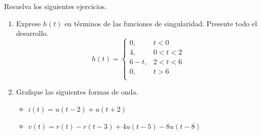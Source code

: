 \documentclass[12pt]{article}
\begin{document}

\noindent Resuelva los siguientes ejercicios.
\begin{enumerate}
    \item Exprese $h(t)$ en términos de las funciones de singularidad. Presente todo el desarrollo.\\ 
     \begin{equation}
      h(t) = \left\lbrace
      \begin{array}{ll}
      0, & t<0 \\
      4, & 0<t<2 \\
      6-t, & 2<t<6\\
      0, & t>6 \\
      \end{array}
      \right.
      \end{equation}
      
    \item Grafique las siguientes formas de onda.
    \begin{itemize} 
        \item $i(t) = u(t-2) + u(t+2)$
        \item  $v(t) = r(t) - r(t-3)+ 4u(t-5) - 8u(t-8)$
    \end{itemize}
        

\end{enumerate}
\end{document}
